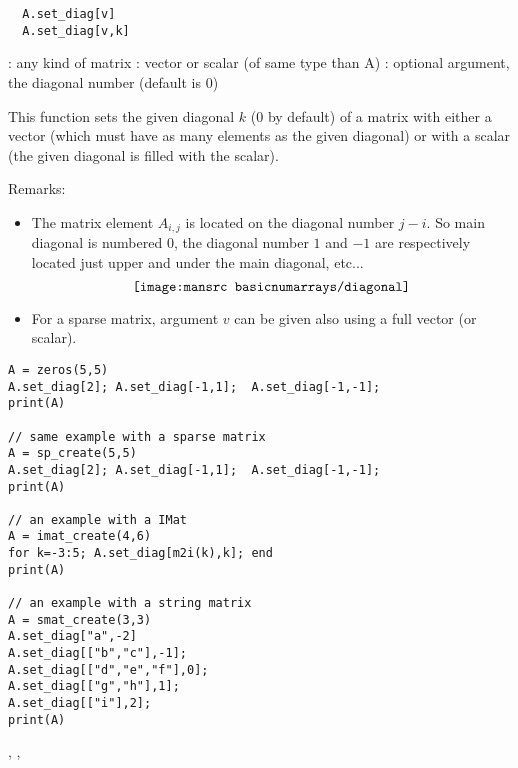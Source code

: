 \begin{mandesc}
\end{mandesc}
\begin{calling_sequence}
\begin{verbatim}
  A.set_diag[v]
  A.set_diag[v,k]
\end{verbatim}
\end{calling_sequence}
\begin{parameters}
  \begin{varlist}
    : any kind of matrix
    : vector or scalar (of same type than A)
    : optional argument, the diagonal number (default is $0$)
  \end{varlist}
\end{parameters}

\begin{mandescription}

  This function sets the given diagonal $k$ (0 by default) of a matrix 
with either a vector (which must have as many elements as the given 
diagonal) or with a scalar (the given diagonal is filled with the
scalar).

Remarks:  
\begin{itemize}
\item The matrix element $A_{i,j}$ is located on the diagonal number $j-i$. So main 
diagonal is numbered $0$, the diagonal number $1$ and $-1$ are respectively located just 
upper and under the main diagonal, etc...
  $$
  \texttt{[image: \\mansrc basicnumarrays/diagonal]} 
  $$

\item For a sparse matrix, argument $v$ can be given also using a full vector (or scalar).

\end{itemize}

\end{mandescription}

\begin{examples}
\begin{Verbatim}
A = zeros(5,5)
A.set_diag[2]; A.set_diag[-1,1];  A.set_diag[-1,-1]; 
print(A)

// same example with a sparse matrix
A = sp_create(5,5)
A.set_diag[2]; A.set_diag[-1,1];  A.set_diag[-1,-1]; 
print(A)

// an example with a IMat
A = imat_create(4,6)
for k=-3:5; A.set_diag[m2i(k),k]; end
print(A)

// an example with a string matrix
A = smat_create(3,3)
A.set_diag["a",-2]
A.set_diag[["b","c"],-1]; 
A.set_diag[["d","e","f"],0]; 
A.set_diag[["g","h"],1]; 
A.set_diag[["i"],2]; 
print(A)
\end{Verbatim}
\end{examples}

\begin{manseealso}
  , , 
\end{manseealso}

